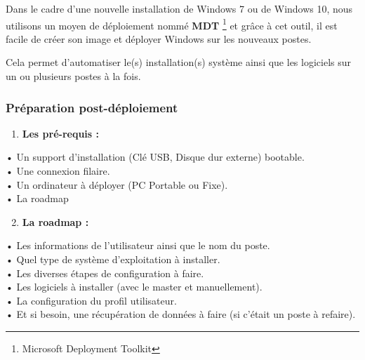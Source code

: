\documentclass[11pt,a4paper,twoside]{article}
\begin{document}
Dans le cadre d’une nouvelle installation de Windows 7 ou de Windows 10, nous utilisons un moyen de déploiement nommé \textbf{MDT}  \footnote{Microsoft Deployment Toolkit} et grâce à cet outil, il est facile de créer son image et déployer Windows sur les nouveaux postes.

Cela permet d’automatiser le(s) installation(s) système ainsi que les logiciels sur un ou plusieurs postes à la fois.
\subsubsection{Préparation post-déploiement}
\begin{enumerate}
    \item \textbf{Les pré-requis :}
\end{enumerate}
•	Un support d’installation (Clé USB, Disque dur externe) bootable. \\
•	Une connexion filaire. \\
•	Un ordinateur à déployer (PC Portable ou Fixe). \\
•	La roadmap

\begin{enumerate}
\setcounter{enumi}{1}
    \item \textbf{La roadmap :}
\end{enumerate}

•	Les informations de l’utilisateur ainsi que le nom du poste. \\
•	Quel type de système d’exploitation à installer.\\
•	Les diverses étapes de configuration à faire.\\
•	Les logiciels à installer (avec le master et manuellement).\\
•	La configuration du profil utilisateur.\\
•	Et si besoin, une récupération de données à faire (si c’était un poste à refaire).
\end{document}
